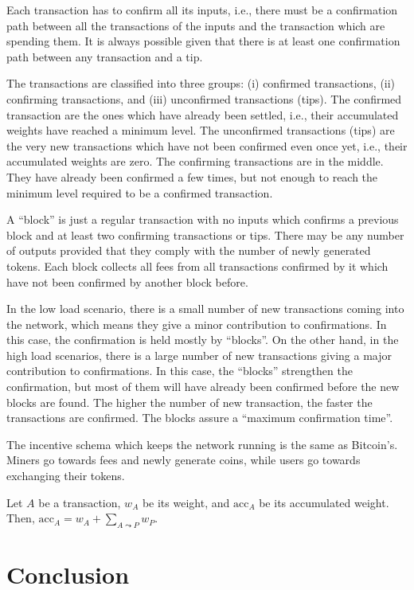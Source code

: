 Each transaction has to confirm all its inputs, i.e., there must be a confirmation path between all the transactions of the inputs and the transaction which are spending them. It is always possible given that there is at least one confirmation path between any transaction and a tip.

The transactions are classified into three groups: (i) confirmed transactions, (ii) confirming transactions, and (iii) unconfirmed transactions (tips). The confirmed transaction are the ones which have already been settled, i.e., their accumulated weights have reached a minimum level. The unconfirmed transactions (tips) are the very new transactions which have not been confirmed even once yet, i.e., their accumulated weights are zero. The confirming transactions are in the middle. They have already been confirmed a few times, but not enough to reach the minimum level required to be a confirmed transaction.

A ``block'' is just a regular transaction with no inputs which confirms a previous block and at least two confirming transactions or tips. There may be any number of outputs provided that they comply with the number of newly generated tokens. Each block collects all fees from all transactions confirmed by it which have not been confirmed by another block before.

In the low load scenario, there is a small number of new transactions coming into the network, which means they give a minor contribution to confirmations. In this case, the confirmation is held mostly by ``blocks''. On the other hand, in the high load scenarios, there is a large number of new transactions giving a major contribution to confirmations. In this case, the ``blocks'' strengthen the confirmation, but most of them will have already been confirmed before the new blocks are found. The higher the number of new transaction, the faster the transactions are confirmed. The blocks assure a ``maximum confirmation time''.

The incentive schema which keeps the network running is the same as Bitcoin's. Miners go towards fees and newly generate coins, while users go towards exchanging their tokens.

Let $A$ be a transaction, $w_A$ be its weight, and $\text{acc}_A$ be its accumulated weight. Then, $\text{acc}_A = w_A + \sum_{A \leadsto P} w_P$.

\chapter{Conclusion}

